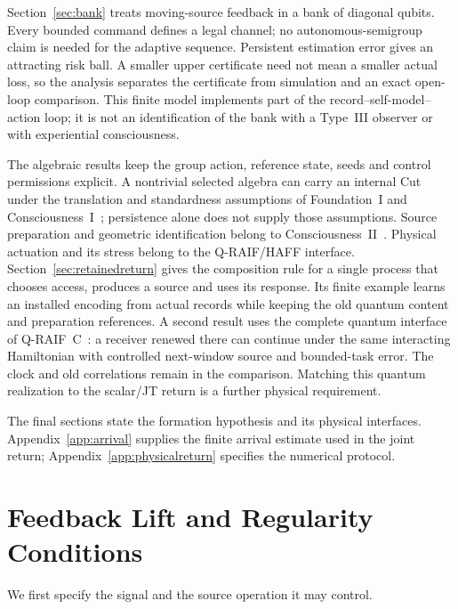 \documentclass[12pt]{article}
\theoremstyle{definition}
\theoremstyle{remark}
\begin{document}
Section~\ref{sec:bank} treats moving-source feedback in a bank of
diagonal qubits. Every bounded command defines a legal channel; no
autonomous-semigroup claim is needed for the adaptive sequence.
Persistent estimation error gives an attracting risk ball.
A smaller upper certificate need not mean a smaller actual loss, so
the analysis separates the certificate from simulation and an exact
open-loop comparison. This finite model implements part of the
record--self-model--action loop; it is not an identification of the
bank with a Type~III observer or with experiential consciousness.

The algebraic results keep the group action, reference state, seeds and
control permissions explicit. A nontrivial selected algebra can carry
an internal Cut under the translation and standardness assumptions of
Foundation~I and Consciousness~I~\cite{PaperI}; persistence alone does
not supply those assumptions. Source preparation and geometric
identification belong to Consciousness~II~\cite{PaperII}.
Physical actuation and its stress belong to the Q-RAIF/HAFF interface.
Section~\ref{sec:retainedreturn} gives the composition rule for a
single process that chooses access, produces a source and uses its
response. Its finite example learns an installed encoding from actual
records while keeping the old quantum content and preparation
references. A second result uses the complete quantum interface of
Q-RAIF~C~\cite{QRAIFC}: a receiver renewed there can continue under
the same interacting Hamiltonian with controlled next-window source
and bounded-task error. The clock and old correlations remain in the
comparison. Matching this quantum realization to the scalar/JT return
is a further physical requirement.

The final sections state the formation hypothesis and its physical
interfaces. Appendix~\ref{app:arrival} supplies the finite arrival
estimate used in the joint return; Appendix~\ref{app:physicalreturn}
specifies the numerical protocol.

\section{Feedback Lift and Regularity Conditions}\label{sec:feedback}

We first specify the signal and the source operation it may control.
\end{document}
